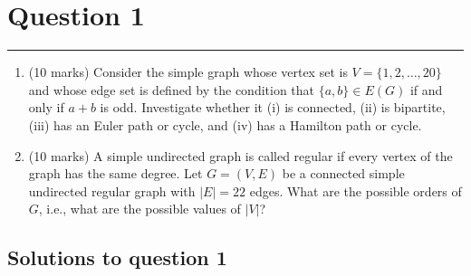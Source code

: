 \documentclass{article}
\begin{document}
\newcommand{\documentcourse}{COMP2121}
\newcommand{\documentnumber}{5}





\section*{Question 1}
\hrule
\vspace{0.5cm}

\begin{enumerate}[label=(\alph*)]

    \item (10 marks) Consider the simple graph whose vertex set is $V = \{1, 2, \dots, 20\}$ and whose edge set is defined by the condition that $\{a, b\} \in E(G)$ if and only if $a + b$ is odd. Investigate whether it (i) is connected, (ii) is bipartite, (iii) has an Euler path or cycle, and (iv) has a Hamilton path or cycle.

    \item (10 marks) A simple undirected graph is called regular if every vertex of the graph has the same degree.
          Let $G = (V, E)$ be a connected simple undirected regular graph with $|E| = 22$ edges. What are the possible orders of $G$, i.e., what are the possible values of $|V|$?
\end{enumerate}

\subsection*{Solutions to question 1}
\end{document}
